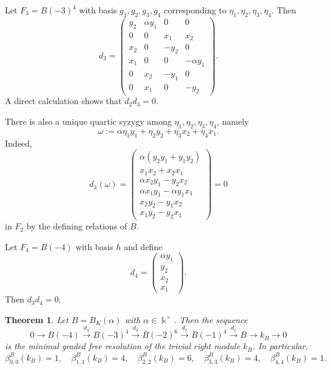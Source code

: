 \documentclass[reqno]{amsart}
\numberwithin{equation}{section}
\newtheorem{theorem}{Theorem}[section]
\theoremstyle{definition}
\begin{document}
Let \(F_3=B(-3)^4\) with basis \(g_1,g_2,g_3,g_4\) corresponding to \(\eta_1,\eta_2,\eta_3,\eta_4\). Then
\begin{equation}\label{eq:d3}
d_3=
\begin{pmatrix}
y_2      & \alpha y_1 & 0       & 0 \\
0        & 0          & x_1     & x_2 \\
x_2      & 0          & -y_2    & 0 \\
x_1      & 0          & 0       & -\alpha y_1 \\
0        & x_2        & -y_1    & 0 \\
0        & x_1        & 0       & -y_2
\end{pmatrix}.
\end{equation}
A direct calculation shows that \(d_2d_3=0\).

There is also a unique quartic syzygy among \(\eta_1,\eta_2,\eta_3,\eta_4\), namely
\begin{equation}\label{eq:quartic}
\omega:=\alpha \eta_1y_1+\eta_2y_2+\eta_3x_2+\eta_4x_1.
\end{equation}
Indeed,
\[
d_3(\omega)=
\begin{pmatrix}
\alpha(y_2y_1+y_1y_2)\\
x_1x_2+x_2x_1\\
\alpha x_2y_1-y_2x_2\\
\alpha x_1y_1-\alpha y_1x_1\\
x_2y_2-y_1x_2\\
x_1y_2-y_2x_1
\end{pmatrix}
=0
\]
in \(F_2\) by the defining relations of \(B\).

Let \(F_4=B(-4)\) with basis \(h\) and define
\begin{equation}\label{eq:d4}
d_4=
\begin{pmatrix}
\alpha y_1\\
y_2\\
x_2\\
x_1
\end{pmatrix}.
\end{equation}
Then \(d_3d_4=0\).

\begin{theorem}\label{thm:k-resolution}
Let \(B=B_K(\alpha)\) with \(\alpha\in\Bbbk^\times\). Then the sequence
\[
0\longrightarrow B(-4)\xrightarrow{d_4}B(-3)^4\xrightarrow{d_3}B(-2)^6\xrightarrow{d_2}B(-1)^4\xrightarrow{d_1}B\longrightarrow k_B\longrightarrow 0
\]
is the minimal graded free resolution of the trivial right module \(k_B\).
In particular,
\[
\beta_{0,0}^B(k_B)=1,\quad
\beta_{1,1}^B(k_B)=4,\quad
\beta_{2,2}^B(k_B)=6,\quad
\beta_{3,3}^B(k_B)=4,\quad
\beta_{4,4}^B(k_B)=1.
\]
\end{theorem}
\end{document}
